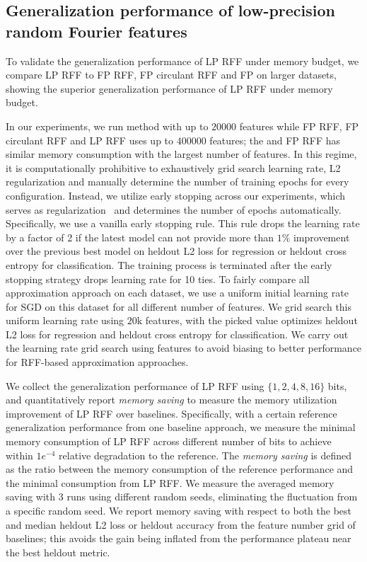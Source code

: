 \subsection{Generalization performance of low-precision random Fourier features}
To validate the generalization performance of LP RFF under memory budget, we compare LP RFF to FP RFF, FP circulant RFF and FP \Nystrom on larger datasets, showing the superior generalization performance of LP RFF under memory budget. 

In our experiments, we run \Nystrom method with up to $20000$ features while FP RFF, FP circulant RFF and LP RFF uses up to $400000$ features; the \Nystrom and FP RFF has similar memory consumption with the largest number of features. In this regime, it is computationally prohibitive to exhaustively grid search learning rate, L2 regularization and manually determine the number of training epochs for every configuration. Instead, we utilize early stopping across our experiments, which serves as regularization~\cite{wei2017early, zhang2005boosting} and determines the number of epochs automatically. Specifically, we use a vanilla early stopping rule. This rule drops the learning rate by a factor of 2 if the latest model can not provide more than $1\%$ improvement over the previous best model on heldout L2 loss for regression or heldout cross entropy for classification. The training process is terminated after the early stopping strategy drops learning rate for 10 ties. To fairly compare all approximation approach on each dataset, we use a uniform initial learning rate for SGD on this dataset for all different number of features. We grid search this uniform learning rate using $20\text{k}$ \Nystrom features, with the picked value optimizes heldout L2 loss for regression and heldout cross entropy for classification. We carry out the learning rate grid search using \Nystrom features to avoid biasing to better performance for RFF-based approximation approaches. 

We collect the generalization performance of LP RFF using $\{1,2,4,8,16\}$ bits, and quantitatively report \emph{memory saving} to measure the memory utilization improvement of LP RFF over baselines. Specifically, with a certain reference generalization performance from one baseline approach, we measure the minimal memory consumption of LP RFF across different number of bits to achieve within $1e^{-4}$ relative degradation to the reference. The \emph{memory saving} is defined as the ratio between the memory consumption of the reference performance and the minimal consumption from LP RFF. We measure the averaged memory saving with 3 runs using different random seeds, eliminating the fluctuation from a specific random seed. We report memory saving with respect to both the best and median heldout L2 loss or heldout accuracy from the feature number grid of baselines; this avoids the gain being inflated from the performance plateau near the best heldout metric.

